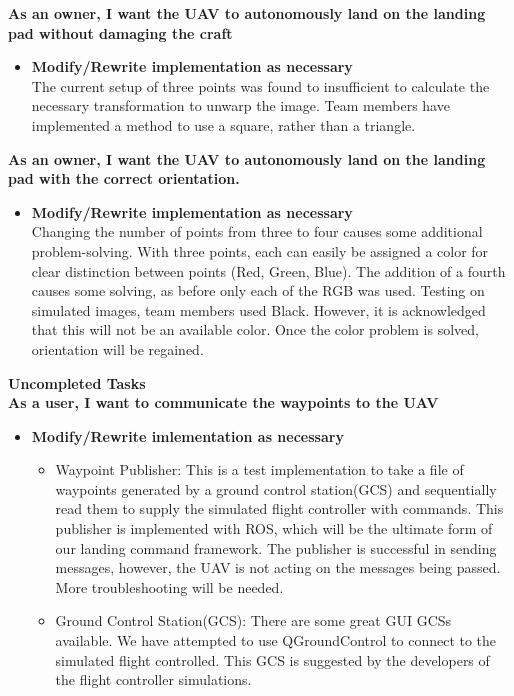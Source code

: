 \vspace{3mm}
\noindent \large{\textbf{As an owner, I want the UAV to autonomously land on the landing pad without damaging the craft}}
\normalsize
\begin{itemize}
\item \textbf{Modify/Rewrite implementation as necessary}\\
The current setup of three points was found to insufficient to calculate the necessary transformation to unwarp the image. Team members have implemented a method to use a square, rather than a triangle.  
\end{itemize}

\vspace{3mm}
\noindent \large{\textbf{As an owner, I want the UAV to autonomously land on the landing pad with the correct orientation.}}
\normalsize
\begin{itemize}
\item \textbf{Modify/Rewrite implementation as necessary}\\
Changing the number of points from three to four causes some additional problem-solving. With three points, each can easily be assigned a color for clear distinction between points (Red, Green, Blue). The addition of a fourth causes some solving, as before only each of the RGB was used. Testing on simulated images, team members used Black. However, it is acknowledged that this will not be an available color. Once the color problem is solved, orientation will be regained.
\end{itemize}

\vspace{5mm}
\noindent\Large{\textbf{Uncompleted Tasks}}\\
\vspace{4mm}
\noindent \large{\textbf{As a user, I want to communicate the waypoints to the UAV}}
\normalsize
\begin{itemize}
\item \textbf{Modify/Rewrite imlementation as necessary}
\begin{itemize}
\item Waypoint Publisher: This is a test implementation to take a file of waypoints generated by a ground control station(GCS) and sequentially read them to supply the simulated flight controller with commands. This publisher is implemented with ROS, which will be the ultimate form of our landing command framework. The publisher is successful in sending messages, however, the UAV is not acting on the messages being passed. More troubleshooting will be needed.
\item Ground Control Station(GCS): There are some great GUI GCSs available. We have attempted to use QGroundControl to connect to the simulated flight controlled. This GCS is suggested by the developers of the flight controller simulations. 
\end{itemize} 
\end{itemize}

